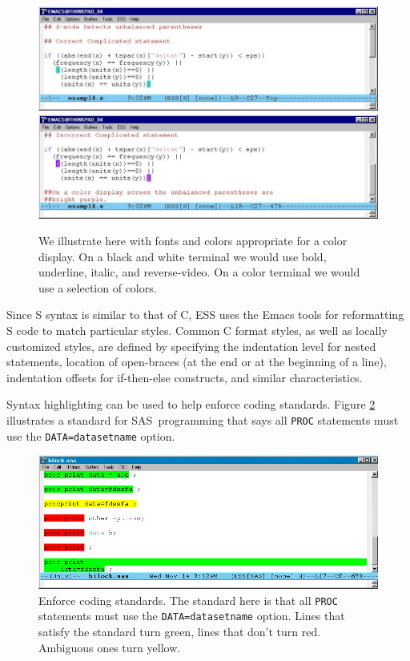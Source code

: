 \documentclass{article}
\newif\ifdraft
\newcommand*{\SAS}{\textsc{SAS}}
\newcommand{\stexttt}[1]{{\small\texttt{#1}}}
\newcommand{\emptyfig}{
\hspace*{42pt}\rule{324pt}{.25pt}\\
\hspace*{42pt}\rule{.25pt}{10pc}
\rule{316pt}{.25pt}
\rule{.25pt}{10pc}}
\begin{document}
\begin{figure}[tbp]%
  \centering
\ifdraft
  \emptyfig
\else
  \includegraphics[angle=270,width=\textwidth]{font-cor-s}
  \includegraphics[angle=270,width=\textwidth]{font-incor-s}
\fi
  \caption{We illustrate here with fonts and colors appropriate for a
    color display.  On a black and white terminal we would use bold,
    underline, italic, and reverse-video.  On a color terminal we
    would use a selection of colors.}
  \label{f.font}
\end{figure}

Since S syntax is similar to that of C, ESS uses the Emacs tools for
reformatting S code to match particular styles.  Common C format styles,
as well as locally customized styles, are defined by specifying the indentation
level for nested statements, location of open-braces (at the end or at the
beginning of a line), indentation offsets for if-then-else constructs,
and similar characteristics.

Syntax highlighting can be used to help enforce coding
standards.  Figure \ref{f.hilock} illustrates a standard for
\SAS\ programming that says all \stexttt{PROC} statements must use the
\stexttt{DATA=datasetname} option.

\begin{figure}[tbp]
  \centering
  \ifdraft
     \emptyfig
  \else
     \includegraphics[angle=270,width=\textwidth]{hilock-sas}
  \fi
  \caption{Enforce coding standards.  The standard here is
    that all \stexttt{PROC} statements must use the
    \stexttt{DATA=datasetname} option.  Lines that satisfy the
    standard turn green, lines that don't turn red.
    Ambiguous ones turn yellow.}
  \label{f.hilock}
\end{figure}
\end{document}
